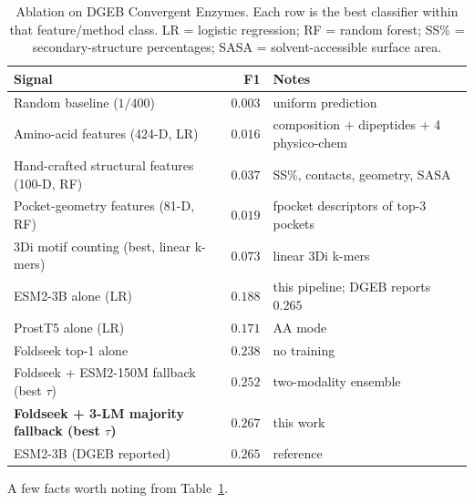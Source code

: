 \documentclass[11pt,letterpaper]{article}
\begin{document}
\begin{table}[h]
\centering
\caption{Ablation on DGEB Convergent Enzymes. Each row is the best
classifier within that feature/method class. LR = logistic
regression; RF = random forest; SS\% = secondary-structure
percentages; SASA = solvent-accessible surface area.}
\label{tab:ablation}
\small
\setlength{\tabcolsep}{4pt}
\begin{tabular}{lrl}
\toprule
Signal & F1 & Notes \\
\midrule
Random baseline ($1/400$) & $0.003$ & uniform prediction \\
Amino-acid features (424-D, LR) & $0.016$ & composition + dipeptides + 4 physico-chem \\
Hand-crafted structural features (100-D, RF) & $0.037$ & SS\%, contacts, geometry, SASA \\
Pocket-geometry features (81-D, RF) & $0.019$ & fpocket descriptors of top-3 pockets \\
3Di motif counting (best, linear k-mers) & $0.073$ & linear 3Di k-mers \citep{vankempen2024foldseek} \\
ESM2-3B alone (LR) & $0.188$ & this pipeline; DGEB reports $0.265$ \\
ProstT5 alone (LR) & $0.171$ & AA mode \\
Foldseek top-1 alone & $0.238$ & no training \\
Foldseek + ESM2-150M fallback (best $\tau$) & $0.252$ & two-modality ensemble \\
\textbf{Foldseek + 3-LM majority fallback (best $\tau$)} & $\mathbf{0.267}$ & this work \\
ESM2-3B (DGEB reported) & $0.265$ & reference \\
\bottomrule
\end{tabular}
\end{table}

A few facts worth noting from Table~\ref{tab:ablation}.
\end{document}
